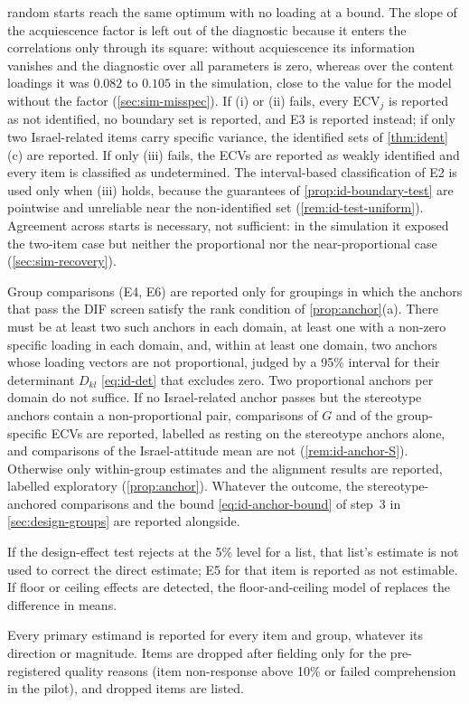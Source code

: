 \begin{description}[style=unboxed,leftmargin=0pt]
random starts reach the same optimum with no loading at a bound. The slope of the acquiescence factor is left out of the diagnostic because it enters the correlations only through its square: without acquiescence its information vanishes and the diagnostic over all parameters is zero, whereas over the content loadings it was $0.082$ to $0.105$ in the simulation, close to the value for the model without the factor (\cref{sec:sim-misspec}). If (i) or (ii) fails, every $\mathrm{ECV}_j$ is reported as not identified, no boundary set is reported, and E3 is reported instead; if only two Israel-related items carry specific variance, the identified sets of \cref{thm:ident}(c) are reported. If only (iii) fails, the ECVs are reported as weakly identified and every item is classified as undetermined. The interval-based classification of E2 is used only when (iii) holds, because the guarantees of \cref{prop:id-boundary-test} are pointwise and unreliable near the non-identified set (\cref{rem:id-test-uniform}). Agreement across starts is necessary, not sufficient: in the simulation it exposed the two-item case but neither the proportional nor the near-proportional case (\cref{sec:sim-recovery}).
  \item[D3, invariance.] Group comparisons (E4, E6) are reported only for groupings in which the anchors that pass the DIF screen satisfy the rank condition of \cref{prop:anchor}(a). There must be at least two such anchors in each domain, at least one with a non-zero specific loading in each domain, and, within at least one domain, two anchors whose loading vectors are not proportional, judged by a 95\% interval for their determinant $D_{kl}$ \eqref{eq:id-det} that excludes zero. Two proportional anchors per domain do not suffice. If no Israel-related anchor passes but the stereotype anchors contain a non-proportional pair, comparisons of $G$ and of the group-specific ECVs are reported, labelled as resting on the stereotype anchors alone, and comparisons of the Israel-attitude mean are not (\cref{rem:id-anchor-S}). Otherwise only within-group estimates and the alignment results are reported, labelled exploratory (\cref{prop:anchor}). Whatever the outcome, the stereotype-anchored comparisons and the bound \eqref{eq:id-anchor-bound} of step~3 in \cref{sec:design-groups} are reported alongside.
  \item[D4, design effects.] If the design-effect test rejects at the 5\% level for a list, that list's estimate is not used to correct the direct estimate; E5 for that item is reported as not estimable. If floor or ceiling effects are detected, the floor-and-ceiling model of \citet{blair2012} replaces the difference in means.
  \item[D5, completeness.] Every primary estimand is reported for every item and group, whatever its direction or magnitude. Items are dropped after fielding only for the pre-registered quality reasons (item non-response above 10\% or failed comprehension in the pilot), and dropped items are listed.
\end{description}


